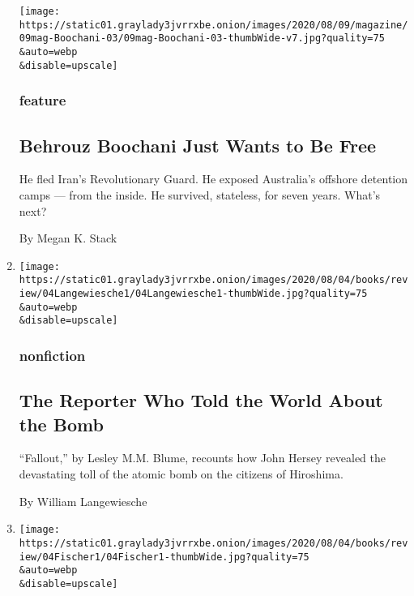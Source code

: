 \begin{enumerate}
  \texttt{[image: https://static01.graylady3jvrrxbe.onion/images/2020/08/09/magazine/09mag-Boochani-03/09mag-Boochani-03-thumbWide-v7.jpg?quality=75\\\&auto=webp\\\&disable=upscale]}

  \hypertarget{feature}{%
  \subsubsection{feature}\label{feature}}

  \hypertarget{behrouz-boochani-just-wants-to-be-free}{%
  \subsection{Behrouz Boochani Just Wants to Be
  Free}\label{behrouz-boochani-just-wants-to-be-free}}

  He fled Iran's Revolutionary Guard. He exposed Australia's offshore
  detention camps --- from the inside. He survived, stateless, for seven
  years. What's next?

  By Megan K. Stack
\item
  \href{/2020/08/04/books/review/fallout-hiroshima-hersey-lesley-m-m-blume.html}{}

  \texttt{[image: https://static01.graylady3jvrrxbe.onion/images/2020/08/04/books/review/04Langewiesche1/04Langewiesche1-thumbWide.jpg?quality=75\\\&auto=webp\\\&disable=upscale]}

  \hypertarget{nonfiction-1}{%
  \subsubsection{nonfiction}\label{nonfiction-1}}

  \hypertarget{the-reporter-who-told-the-world-about-the-bomb}{%
  \subsection{The Reporter Who Told the World About the
  Bomb}\label{the-reporter-who-told-the-world-about-the-bomb}}

  ``Fallout,'' by Lesley M.M. Blume, recounts how John Hersey revealed
  the devastating toll of the atomic bomb on the citizens of Hiroshima.

  By William Langewiesche
\item
  \href{/2020/08/04/books/review/looking-for-miss-america-margot-mifflin.html}{}

  \texttt{[image: https://static01.graylady3jvrrxbe.onion/images/2020/08/04/books/review/04Fischer1/04Fischer1-thumbWide.jpg?quality=75\\\&auto=webp\\\&disable=upscale]}


\end{enumerate}
